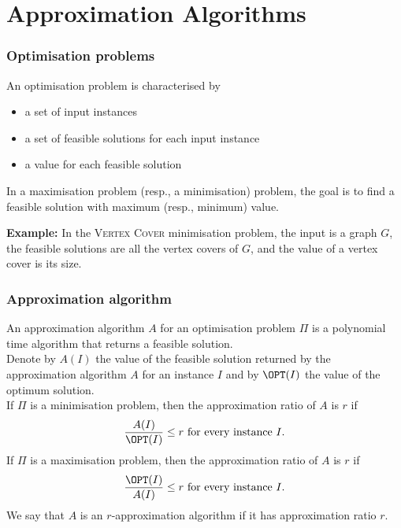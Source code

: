 
\newcommand{\vcpre}{\textsf{VC-preprocess}\xspace}




\section{Approximation Algorithms}

\begin{frame}
	\frametitle{Optimisation problems}
	
	\begin{definition}
		An \alert{optimisation problem} is characterised by
		\begin{itemize}
			\item a set of input instances
			\item a set of \alert{feasible solutions} for each input instance
			\item a \alert{value} for each feasible solution
		\end{itemize}
		In a \alert{maximisation} problem (resp., a \alert{minimisation}) problem, the goal is to find a feasible solution with maximum (resp., minimum) value.
	\end{definition}

	\noindent \textbf{Example:}
	In the \textsc{Vertex Cover} minimisation problem, the input is a graph $G$, the feasible solutions are all the vertex covers of $G$, and the value of a vertex cover is its size.
	
\end{frame}

\begin{frame}
	\frametitle{Approximation algorithm}
	
	\begin{definition}
		An \alert{approximation algorithm} $A$ for an optimisation problem $\Pi$ is a polynomial time algorithm that returns a feasible solution.\\
		Denote by $A(I)$ the value of the feasible solution returned by the approximation algorithm $A$ for an instance $I$ and by $\OPT(I)$ the value of the optimum solution.\\
		If $\Pi$ is a minimisation problem, then the \alert{approximation ratio} of $A$ is $r$ if
		\begin{align*}
		 \frac{A(I)}{\OPT(I)} \le r \text{ for every instance $I$.}
		\end{align*}
		If $\Pi$ is a maximisation problem, then the \alert{approximation ratio} of $A$ is $r$ if
		\begin{align*}
		 \frac{\OPT(I)}{A(I)} \le r \text{ for every instance $I$.}
		\end{align*}
		We say that $A$ is an $r$-approximation algorithm if it has approximation ratio $r$.
	\end{definition}
\end{frame}

